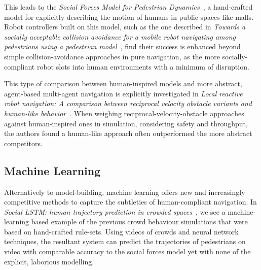 \documentclass{sfuthesis}
\begin{document}
This leads to the \textit{Social Forces Model for Pedestrian Dynamics}~\cite{helbing1995social}, a hand-crafted model for explicitly describing the motion of humans in public spaces like malls. Robot controllers built on this model, such as the one described in \textit{Towards a socially acceptable collision avoidance for a mobile robot navigating among pedestrians using a pedestrian model}~\cite{shiomi2014towards}, find their success is enhanced beyond simple collision-avoidance approaches in pure navigation, as the more socially-compliant robot slots into human environments with a minimum of disruption.

This type of comparison between human-inspired models and more abstract, agent-based multi-agent navigation is explicitly investigated in \textit{Local reactive robot navigation: A comparison between reciprocal velocity obstacle variants and human-like behavior}~\cite{guzzi2013local}. When weighing reciprocal-velocity-obstacle approaches against human-inspired ones in simulation, considering safety and throughput, the authors found a human-like approach often outperformed the more abstract competitors.










\subsection{Machine Learning}

Alternatively to model-building, machine learning offers new and increasingly competitive methods to capture the subtleties of human-compliant navigation. In \textit{Social LSTM: human trajectory prediction in crowded spaces}~\cite{alahi2016social}, we see a machine-learning based example of the previous crowd behaviour simulations that were based on hand-crafted rule-sets. Using videos of crowds and neural network techniques, the resultant system can predict the trajectories of pedestrians on video with comparable accuracy to the social forces model yet with none of the explicit, laborious modelling. 
\end{document}
